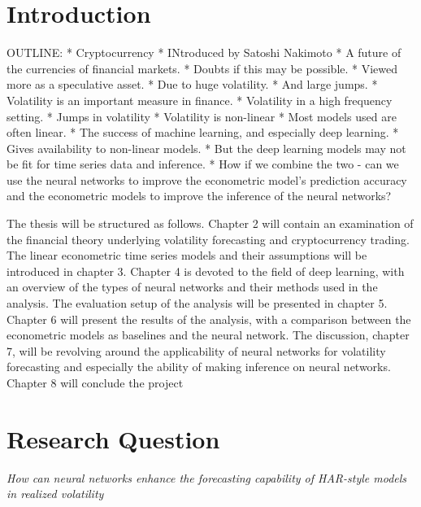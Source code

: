 \chapter{Introduction}
\label{sec:org06668a7}
OUTLINE:
    * Cryptocurrency
    * INtroduced by Satoshi Nakimoto
    * A future of the currencies of financial markets. 
    * Doubts if this may be possible.
    * Viewed more as a speculative asset.
    * Due to huge volatility.
    * And large jumps.
    * Volatility is an important measure in finance.
    * Volatility in a high frequency setting.
    * Jumps in volatility 
    * Volatility is non-linear
    * Most models used are often linear.
    * The success of machine learning, and especially deep learning.
    * Gives availability to non-linear models.
    * But the deep learning models may not be fit for time series data and inference.
    * How if we combine the two - can we use the neural networks to improve the econometric model's prediction accuracy and the econometric models to improve the inference of the neural networks?





The thesis will be structured as follows.
Chapter 2 will contain an examination of the financial theory underlying volatility forecasting and cryptocurrency trading.
The linear econometric time series models and their assumptions will be introduced in chapter 3.
Chapter 4 is devoted to the field of deep learning, with an overview of the types of neural networks and their methods used in the analysis.
The evaluation setup of the analysis will be presented in chapter 5.
Chapter 6 will present the results of the analysis, with a comparison between the econometric models as baselines and the neural network.
The discussion, chapter 7, will be revolving around the applicability of neural networks for volatility forecasting and especially the ability of making inference on neural networks.
Chapter 8 will conclude the project

\chapter{Research Question}
\label{sec:org6232157}
\emph{How can neural networks enhance the forecasting capability of HAR-style models in realized volatility}

